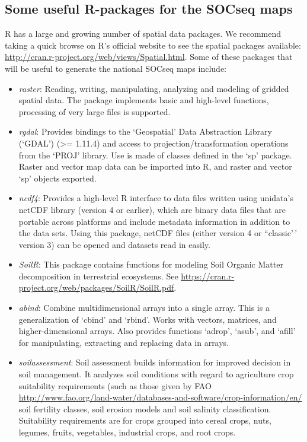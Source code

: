 \documentclass[
  10pt,
  b5paper,
]{book}
\providecommand{\tightlist}{%
  \setlength{\itemsep}{0pt}\setlength{\parskip}{0pt}}
\begin{document}
\hypertarget{some-useful-r-packages-for-the-socseq-maps}{%
\subsection{Some useful R-packages for the SOCseq maps}\label{some-useful-r-packages-for-the-socseq-maps}}

R has a large and growing number of spatial data packages. We recommend taking a quick browse on R's official website to see the spatial packages available: \url{http://cran.r-project.org/web/views/Spatial.html}. Some of these packages that will be useful to generate the national SOCseq maps include:

\begin{itemize}
\tightlist
\item
  \emph{raster}: Reading, writing, manipulating, analyzing and modeling of gridded spatial data. The package implements basic and high-level functions, processing of very large files is supported.
\item
  \emph{rgdal}: Provides bindings to the `Geospatial' Data Abstraction Library (`GDAL') (\textgreater= 1.11.4) and access to projection/transformation operations from the `PROJ' library. Use is made of classes defined in the `sp' package. Raster and vector map data can be imported into R, and raster and vector `sp' objects exported.
\item
  \emph{ncdf4}: Provides a high-level R interface to data files written using unidata's netCDF library (version 4 or earlier), which are binary data files that are portable across platforms and include metadata information in addition to the data sets. Using this package, netCDF files (either version 4 or ``classic'\,' version 3) can be opened and datasets read in easily.
\item
  \emph{SoilR}: This package contains functions for modeling Soil Organic Matter decomposition in terrestrial ecosystems. See \url{https://cran.r-project.org/web/packages/SoilR/SoilR.pdf}.
\item
  \emph{abind}: Combine multidimensional arrays into a single array. This is a generalization of `cbind' and `rbind'. Works with vectors, matrices, and higher-dimensional arrays. Also provides functions `adrop', `asub', and `afill' for manipulating, extracting and replacing data in arrays.
\item
  \emph{soilassessment}: Soil assessment builds information for improved decision in soil management. It analyzes soil conditions with regard to agriculture crop suitability requirements (such as those given by FAO \url{http://www.fao.org/land-water/databases-and-software/crop-information/en/} soil fertility classes, soil erosion models and soil salinity classification. Suitability requirements are for crops grouped into cereal crops, nuts, legumes, fruits, vegetables, industrial crops, and root crops.
\end{itemize}
\end{document}
